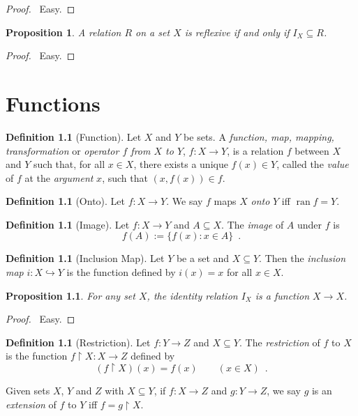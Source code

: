 \documentclass{report}
\let\qed\relax
\newtheorem{prop}[ax]{Proposition}
\theoremstyle{definition}
\newtheorem{df}[ax]{Definition}
\newcommand{\ran}{\ensuremath{\operatorname{ran}}}
\begin{document}
\begin{proof}
\pf\ Easy. \qed
\end{proof}

\begin{prop}
A relation $R$ on a set $X$ is reflexive if and only if $I_X \subseteq R$.
\end{prop}

\begin{proof}
\pf\ Easy. \qed
\end{proof}


\chapter{Functions}

\begin{df}[Function]
Let $X$ and $Y$ be sets. A \emph{function, map, mapping, transformation} or \emph{operator $f$ from $X$ to $Y$}, $f : X \rightarrow Y$, is a relation $f$ between $X$ and $Y$ such that, for all $x \in X$, there exists a unique $f(x) \in Y$, called the \emph{value} of $f$ at the \emph{argument} $x$, such that $(x,f(x)) \in f$.
\end{df}

\begin{df}[Onto]
Let $f : X \rightarrow Y$. We say $f$ maps $X$ \emph{onto} $Y$ iff $\ran f = Y$.
\end{df}

\begin{df}[Image]
Let $f : X \rightarrow Y$ and $A \subseteq X$. The \emph{image} of $A$ under $f$ is
\[ f(A) := \{ f(x) : x \in A \} \enspace . \]
\end{df}

\begin{df}[Inclusion Map]
Let $Y$ be a set and $X \subseteq Y$. Then the \emph{inclusion map} $i : X \hookrightarrow Y$ is the function defined by $i(x) = x$ for all $x \in X$.
\end{df}

\begin{prop}
For any set $X$, the identity relation $I_X$ is a function $X \rightarrow X$.
\end{prop}

\begin{proof}
\pf\ Easy. \qed
\end{proof}

\begin{df}[Restriction]
Let $f : Y \rightarrow Z$ and $X \subseteq Y$. The \emph{restriction} of $f$ to $X$ is the function $f \restriction X : X \rightarrow Z$ defined by
\[ (f \restriction X)(x) = f(x) \qquad (x \in X) \enspace . \]

Given sets $X$, $Y$ and $Z$ with $X \subseteq Y$, if $f : X \rightarrow Z$ and $g : Y \rightarrow Z$, we say $g$ is an \emph{extension} of $f$ to $Y$ iff $f = g \restriction X$.
\end{df}
\end{document}

